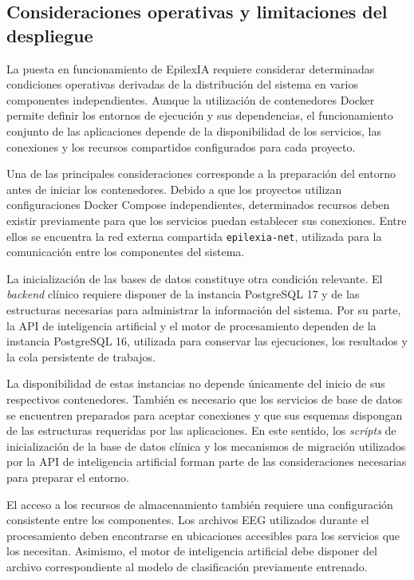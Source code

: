 \subsection[Consideraciones operativas y limitaciones del despliegue]{Consideraciones operativas y limitaciones del \\despliegue}

La puesta en funcionamiento de EpilexIA requiere considerar
determinadas condiciones operativas derivadas de la
distribución del sistema en varios componentes independientes.
Aunque la utilización de contenedores Docker permite definir
los entornos de ejecución y sus dependencias, el funcionamiento
conjunto de las aplicaciones depende de la disponibilidad
de los servicios, las conexiones y los recursos compartidos
configurados para cada proyecto.

Una de las principales consideraciones corresponde a la
preparación del entorno antes de iniciar los contenedores.
Debido a que los proyectos utilizan configuraciones Docker
Compose independientes, determinados recursos deben existir
previamente para que los servicios puedan establecer sus
conexiones. Entre ellos se encuentra la red externa compartida
\texttt{epilexia-net}, utilizada para la comunicación entre
los componentes del sistema.

La inicialización de las bases de datos constituye otra
condición relevante. El \textit{backend} clínico requiere disponer
de la instancia PostgreSQL 17 y de las estructuras necesarias
para administrar la información del sistema. Por su parte,
la API de inteligencia artificial y el motor de procesamiento
dependen de la instancia PostgreSQL 16, utilizada para
conservar las ejecuciones, los resultados y la cola
persistente de trabajos.

La disponibilidad de estas instancias no depende únicamente
del inicio de sus respectivos contenedores. También es
necesario que los servicios de base de datos se encuentren
preparados para aceptar conexiones y que sus esquemas
dispongan de las estructuras requeridas por las aplicaciones.
En este sentido, los \textit{scripts} de inicialización de la base
de datos clínica y los mecanismos de migración utilizados
por la API de inteligencia artificial forman parte de las
consideraciones necesarias para preparar el entorno.

El acceso a los recursos de almacenamiento también requiere
una configuración consistente entre los componentes. Los
archivos EEG utilizados durante el procesamiento deben
encontrarse en ubicaciones accesibles para los servicios
que los necesitan. Asimismo, el motor de inteligencia
artificial debe disponer del archivo correspondiente al
modelo de clasificación previamente entrenado.


